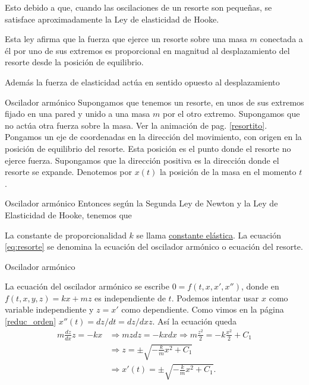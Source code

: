 \documentclass{article}
\begin{document}
Esto debido a que, cuando las oscilaciones de un resorte son
pequeñas,  se satisface aproximadamente la Ley de elasticidad de  Hooke.

Esta ley  afirma que la fuerza que ejerce un resorte sobre una masa $m$ conectada a él por uno 
de sus extremos es proporcional en magnitud al desplazamiento
del resorte desde la posición de equilibrio.

Además la fuerza de elasticidad actúa en sentido opuesto al desplazamiento
 



{Oscilador armónico}
 Supongamos que tenemos un resorte, en unos de sus extremos fijado en una pared y unido a una masa $m$ por el otro extremo. Supongamos que no actúa otra fuerza 
 sobre la masa. Ver la animación de pag. \ref{resortito}.  Pongamos un eje de coordenadas en la dirección del movimiento, con origen en la posición de equilibrio 
 del resorte. Esta posición es el punto donde el resorte no ejerce fuerza. Supongamos que la dirección positiva es la dirección donde el resorte se expande. Denotemos 
 por $x(t)$ la posición de la masa en el momento $t$.  


{Oscilador armónico}
  Entonces según la Segunda Ley de Newton y la Ley de Elasticidad de Hooke, tenemos que
 
 
La constante de proporcionalidad $k$ se llama \href{http://es.wikipedia.org/wiki/Rigidez}{constante elástica}. La ecuación \eqref{eq:resorte} se denomina la
ecuación del oscilador armónico o ecuación del resorte.



{Oscilador armónico}

La ecuación del oscilador armónico se escribe $0=f(t,x,x',x'')$, donde en $f(t,x,y,z)=kx+mz$ es independiente de $t$. Podemos intentar usar $x$ como variable 
independiente y $z=x'$ como dependiente. Como vimos en la página \ref{reduc_orden} $x''(t)=dz/dt=dz/dx z$. Así la ecuación queda
\[\begin{split}
   m\frac{dz}{dx}z=-kx &\Longrightarrow mzdz=-kxdx\Longrightarrow m\frac{z^2}{2}=-k\frac{x^2}{2}+C_1\\
   &\Longrightarrow z=\pm\sqrt{-\frac{k}{m}x^2+C_1}\\
   &\Longrightarrow x'(t)=\pm\sqrt{-\frac{k}{m}x^2+C_1}.\\
  \end{split}
\]
\end{document}
